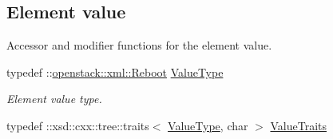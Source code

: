\subsection*{Element value}
\label{_amgrp2ee2eae1a8c390ea033f241c027da8d6}
Accessor and modifier functions for the element value. \begin{DoxyCompactItemize}
\item 
\hypertarget{classopenstack_1_1xml_1_1Reboot___adb1b3e603bec87dce128fd3b05d6d085}{
typedef ::\hyperlink{classopenstack_1_1xml_1_1Reboot}{openstack::xml::Reboot} \hyperlink{classopenstack_1_1xml_1_1Reboot___adb1b3e603bec87dce128fd3b05d6d085}{ValueType}}
\label{classopenstack_1_1xml_1_1Reboot___adb1b3e603bec87dce128fd3b05d6d085}

\begin{DoxyCompactList}\small\item\em Element value type. \item\end{DoxyCompactList}\item 
\hypertarget{classopenstack_1_1xml_1_1Reboot___a856a87a380d5b2f8b089a9379bbb7cd3}{
typedef ::xsd::cxx::tree::traits$<$ \hyperlink{classopenstack_1_1xml_1_1Reboot}{ValueType}, char $>$ \hyperlink{classopenstack_1_1xml_1_1Reboot___a856a87a380d5b2f8b089a9379bbb7cd3}{ValueTraits}}
\label{classopenstack_1_1xml_1_1Reboot___a856a87a380d5b2f8b089a9379bbb7cd3}


\end{DoxyCompactItemize}
